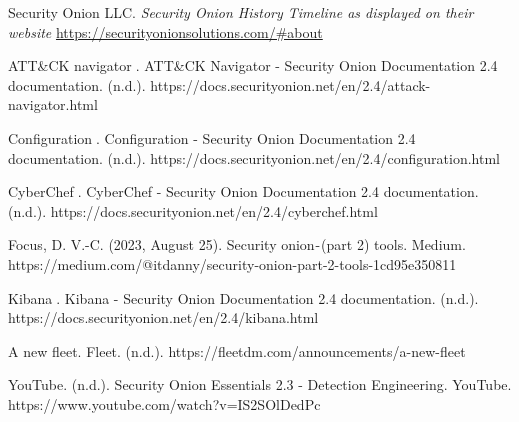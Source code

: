 \documentclass[12pt]{article}
\begin{document}
\begin{thebibliography}{9}
	
Security Onion LLC.
\textit{Security Onion History Timeline as displayed on their website}
\url{https://securityonionsolutions.com/#about}
 
\item ATT&CK navigator. ATT&CK Navigator - Security Onion Documentation 2.4 documentation. (n.d.). https://docs.securityonion.net/en/2.4/attack-navigator.html 
\item Configuration. Configuration - Security Onion Documentation 2.4 documentation. (n.d.). https://docs.securityonion.net/en/2.4/configuration.html 
\item CyberChef. CyberChef - Security Onion Documentation 2.4 documentation. (n.d.). https://docs.securityonion.net/en/2.4/cyberchef.html 
\item Focus, D. V.-C. (2023, August 25). Security onion - (part 2) tools. Medium. https://medium.com/@itdanny/security-onion-part-2-tools-1cd95e350811 
\item Kibana. Kibana - Security Onion Documentation 2.4 documentation. (n.d.). https://docs.securityonion.net/en/2.4/kibana.html 
\item A new fleet. Fleet. (n.d.). https://fleetdm.com/announcements/a-new-fleet 
\item YouTube. (n.d.). Security Onion Essentials 2.3 - Detection Engineering. YouTube. https://www.youtube.com/watch?v=IS2SOlDedPc 

\end{thebibliography}
\end{document}
